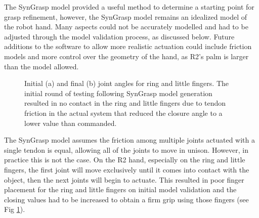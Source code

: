 \documentclass[runningheads,a4paper]{llncs}
\begin{document}
The SynGrasp model provided a useful method to determine a starting point for grasp refinement, however, the SynGrasp model remains an idealized model of the robot hand. Many aspects could not be accurately modelled and had to be adjusted through the model validation process, as discussed below. Future additions to the software to allow more realistic actuation could include friction models and more control over the geometry of the hand, as R2's palm is larger than the model allowed. 

\begin{figure}[!b]
\centering
\null\hfill
	\quad
	\hfill
	\hfill\null
 \caption{Initial (a) and final (b) joint angles for ring and little fingers. The initial round of testing following SynGrasp model generation resulted in no contact in the ring and little fingers due to tendon friction in the actual system that reduced the closure angle to a lower value than commanded.}%
\label{pinkymodels}%
\end{figure}

The SynGrasp model assumes the friction among multiple joints actuated with a single tendon is equal, allowing all of the joints to move in unison. However, in practice this is not the case. On the R2 hand, especially on the ring and little fingers, the first joint will move exclusively until it comes into contact with the object, then the next joints will begin to actuate. This resulted in poor finger placement for the ring and little fingers on initial model validation and the closing values had to be increased to obtain a firm grip using those fingers (see Fig \ref{pinkymodels}).
\end{document}
